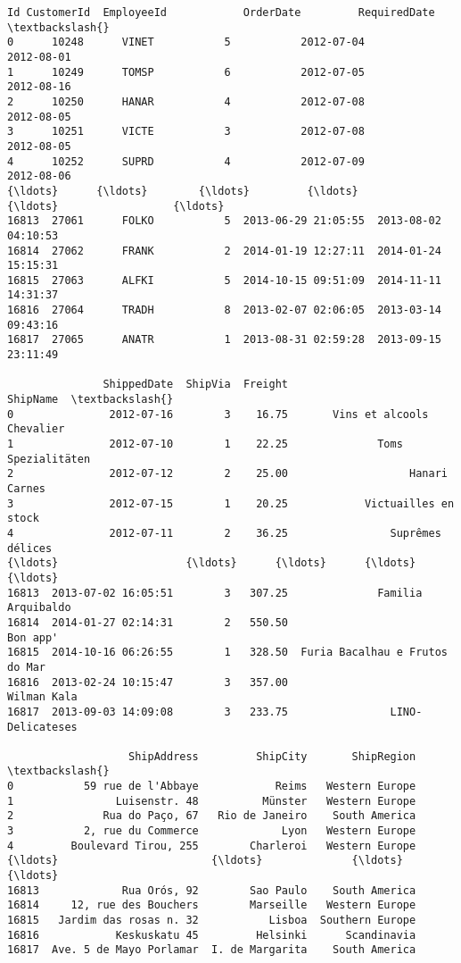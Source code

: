 \documentclass[11pt]{article}
\begin{document}
    \begin{Verbatim}[commandchars=\\\{\}]
          Id CustomerId  EmployeeId            OrderDate         RequiredDate  \textbackslash{}
0      10248      VINET           5           2012-07-04           2012-08-01
1      10249      TOMSP           6           2012-07-05           2012-08-16
2      10250      HANAR           4           2012-07-08           2012-08-05
3      10251      VICTE           3           2012-07-08           2012-08-05
4      10252      SUPRD           4           2012-07-09           2012-08-06
{\ldots}      {\ldots}        {\ldots}         {\ldots}                  {\ldots}                  {\ldots}
16813  27061      FOLKO           5  2013-06-29 21:05:55  2013-08-02 04:10:53
16814  27062      FRANK           2  2014-01-19 12:27:11  2014-01-24 15:15:31
16815  27063      ALFKI           5  2014-10-15 09:51:09  2014-11-11 14:31:37
16816  27064      TRADH           8  2013-02-07 02:06:05  2013-03-14 09:43:16
16817  27065      ANATR           1  2013-08-31 02:59:28  2013-09-15 23:11:49

               ShippedDate  ShipVia  Freight                        ShipName  \textbackslash{}
0               2012-07-16        3    16.75       Vins et alcools Chevalier
1               2012-07-10        1    22.25              Toms Spezialitäten
2               2012-07-12        2    25.00                   Hanari Carnes
3               2012-07-15        1    20.25            Victuailles en stock
4               2012-07-11        2    36.25                Suprêmes délices
{\ldots}                    {\ldots}      {\ldots}      {\ldots}                             {\ldots}
16813  2013-07-02 16:05:51        3   307.25              Familia Arquibaldo
16814  2014-01-27 02:14:31        2   550.50                        Bon app'
16815  2014-10-16 06:26:55        1   328.50  Furia Bacalhau e Frutos do Mar
16816  2013-02-24 10:15:47        3   357.00                     Wilman Kala
16817  2013-09-03 14:09:08        3   233.75                LINO-Delicateses

                   ShipAddress         ShipCity       ShipRegion  \textbackslash{}
0           59 rue de l'Abbaye            Reims   Western Europe
1                Luisenstr. 48          Münster   Western Europe
2              Rua do Paço, 67   Rio de Janeiro    South America
3           2, rue du Commerce             Lyon   Western Europe
4         Boulevard Tirou, 255        Charleroi   Western Europe
{\ldots}                        {\ldots}              {\ldots}              {\ldots}
16813             Rua Orós, 92        Sao Paulo    South America
16814     12, rue des Bouchers        Marseille   Western Europe
16815   Jardim das rosas n. 32           Lisboa  Southern Europe
16816            Keskuskatu 45         Helsinki      Scandinavia
16817  Ave. 5 de Mayo Porlamar  I. de Margarita    South America


\end{Verbatim}
\end{document}
